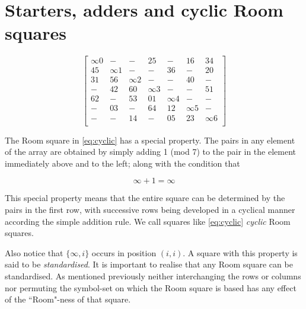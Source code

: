 \documentclass[
  11pt,
  a4paper]{book}
\begin{document}
\hypertarget{starters-adders-and-cyclic-room-squares}{%
\section{Starters, adders and cyclic Room
squares}\label{starters-adders-and-cyclic-room-squares}}

\begin{equation}
  \begin{bmatrix}
    \infty 0 &     -    &     -    &     25     &     -    &     16     &    34    \\
      45     & \infty 1 &     -    &      -     &    36    &      -     &    20    \\
      31     &    56    & \infty 2 &      -     &     -    &     40     &     -    \\
       -     &    42    &    60    &  \infty 3  &     -    &      -     &    51    \\
      62     &     -    &    53    &     01     & \infty 4 &      -     &     -    \\
       -     &    03    &     -    &     64     &    12    &  \infty 5  &     -    \\
       -     &     -    &    14    &      -     &    05    &     23     & \infty 6 \\
  \end{bmatrix}
  \label{eq:cyclic}
\end{equation}

The Room square in \eqref{eq:cyclic} has a special property. The pairs
in any element of the array are obtained by simply adding 1 (mod 7) to
the pair in the element immediately above and to the left; along with
the condition that

\begin{equation}
  \infty + 1 = \infty
\end{equation}

This special property means that the entire square can be determined by
the pairs in the first row, with successive rows being developed in a
cyclical manner according the simple addition rule. We call squares like
\eqref{eq:cyclic} \emph{cyclic} Room squares.

Also notice that \(\{\infty,i\}\) occurs in position \((i,i)\). A square
with this property is said to be \emph{standardised}. It is important to
realise that any Room square can be standardised. As mentioned
previously neither interchanging the rows or columns nor permuting the
symbol-set on which the Room square is based has any effect of the
``Room"-ness of that square.
\end{document}
